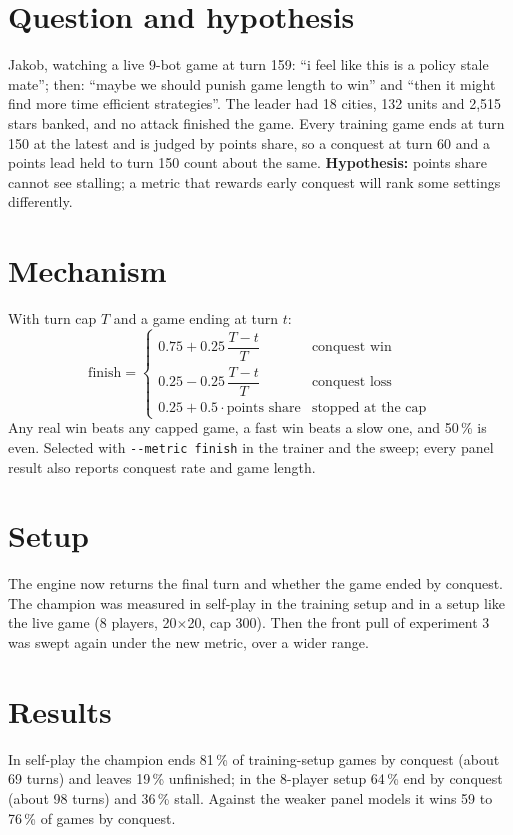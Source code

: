 \documentclass{../polyexp}
\begin{document}

\ExpHeader

\section{Question and hypothesis}
Jakob, watching a live 9-bot game at turn 159: ``i feel like this is a policy stale mate''; then: ``maybe we should punish game length to win'' and ``then it might find more time efficient strategies''. The leader had 18 cities, 132 units and 2,515 stars banked, and no attack finished the game. Every training game ends at turn 150 at the latest and is judged by points share, so a conquest at turn 60 and a points lead held to turn 150 count about the same. \textbf{Hypothesis:} points share cannot see stalling; a metric that rewards early conquest will rank some settings differently.

\section{Mechanism}
With turn cap $T$ and a game ending at turn $t$:
\[
\text{finish} =
\begin{cases}
0.75 + 0.25\,\dfrac{T-t}{T} & \text{conquest win}\\[6pt]
0.25 - 0.25\,\dfrac{T-t}{T} & \text{conquest loss}\\[6pt]
0.25 + 0.5\cdot\text{points share} & \text{stopped at the cap}
\end{cases}
\]
Any real win beats any capped game, a fast win beats a slow one, and 50\,\% is even. Selected with \texttt{-{}-metric finish} in the trainer and the sweep; every panel result also reports conquest rate and game length.

\section{Setup}
The engine now returns the final turn and whether the game ended by conquest. The champion was measured in self-play in the training setup and in a setup like the live game (8 players, 20$\times$20, cap 300). Then the front pull of experiment 3 was swept again under the new metric, over a wider range.

\section{Results}
In self-play the champion ends 81\,\% of training-setup games by conquest (about 69 turns) and leaves 19\,\% unfinished; in the 8-player setup 64\,\% end by conquest (about 98 turns) and 36\,\% stall. Against the weaker panel models it wins 59 to 76\,\% of games by conquest.
\end{document}
